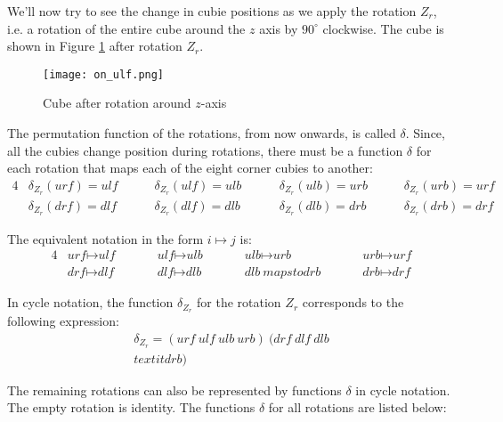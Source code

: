We'll now try to see the change in cubie positions as we apply the rotation $Z_r$, i.e. a rotation of the entire cube around the $z$ axis by $90^\circ$ clockwise. The cube is shown in Figure \ref{Figure_CubeAfterRotationAroundZAxis} after rotation $Z_r$.
\begin{figure}[H]
\centering
\texttt{[image: on\_ulf.png]}
\caption{Cube after rotation around $z$-axis}
\label{Figure_CubeAfterRotationAroundZAxis}
\end{figure}
The permutation function of the rotations, from now onwards, is called $\delta$. Since, all the cubies change position during rotations, there must be a function $\delta$ for each rotation that maps each of the eight corner cubies to another:
\begin{alignat*}{4}
& \delta_{Z_r}(\textit{urf}) = \textit{ulf} \ \ \ \ \ \ && \delta_{Z_r}(\textit{ulf}) = \textit{ulb} \ \ \ \ \ \ && \delta_{Z_r}(\textit{ulb}) = \textit{urb} \ \ \ \ \ \ && \delta_{Z_r}(\textit{urb}) = \textit{urf} \\
& \delta_{Z_r}(\textit{drf}) = \textit{dlf} \ \ \ \ \ \ && \delta_{Z_r}(\textit{dlf}) = \textit{dlb} \ \ \ \ \ \ \ && \delta_{Z_r}(\textit{dlb}) = \textit{drb} \ \ \ \ \ \ && \delta_{Z_r}(\textit{drb}) = \textit{drf}
\end{alignat*}

The equivalent notation in the form $i \mapsto j$ is:
\begin{alignat*}{4}
& \textit{urf} \mapsto \textit{ulf} \ \ \ \ \ \ \ \ && \textit{ulf} \mapsto \textit{ulb} \ \ \ \ \ \ \ \ && \textit{ulb} \mapsto \textit{urb} \ \ \ \ \ \ \ \ && \textit{urb} \mapsto \textit{urf} \\
& \textit{drf} \mapsto \textit{dlf} \ \ \ \ \ \ \ \ && \textit{dlf} \mapsto \textit{dlb} \ \ \ \ \ \ \ \ && \textit{dlb} \ mapsto \textit{drb} \ \ \ \ \ \ \ \ && \textit{drb} \mapsto \textit{drf}
\end{alignat*}

In cycle notation, the function $\delta_{Z_r}$ for the rotation $Z_r$ corresponds to the following expression:
\begin{align*}
\delta _{Z_r}=( \textit{urf} \ \textit{ulf} \ \textit{ulb} \ \textit{urb} )\ ( \textit{drf} \ \textit{dlf} \ \textit{dlb} \\textit{drb} )
\end{align*}
 

The remaining rotations can also be represented by functions $\delta$ in cycle notation. The empty rotation is identity. The functions $\delta$ for all rotations are listed below:

